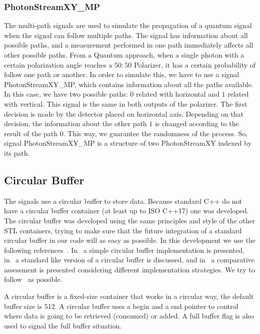 \begin{refsection}
\subsubsection{PhotonStreamXY\_MP}
The multi-path signals are used to simulate the propagation of a quantum signal when the signal can follow multiple paths. The signal has information about all possible paths, and a measurement performed in one path immediately affects all other possible paths.
From a Quantum approach, when a single photon with a certain polarization angle reaches a $50:50$ Polarizer, it has a certain probability of follow one path or another. In order to simulate this, we have to use a signal PhotonStreamXY\_MP, which contains information about all the paths available. In this case, we have two possible paths: $0$ related with horizontal and $1$ related with vertical. This signal is the same in both outputs of the polarizer. The first decision is made by the detector placed on horizontal axis. Depending on that decision, the information about the other path $1$ is changed according to the result of the path $0$. This way, we guarantee the randomness of the process. So, signal PhotonStreamXY\_MP is a structure of two PhotonStreamXY indexed by its path.

\subsection{Circular Buffer}

The signals use a circular buffer to store data.
Because standard C++ do not have a circular buffer container (at least up to ISO C++17) one was developed.
The circular buffer was developed using the same principles and style of the other STL containers, trying to make sure that the future integration of a standard circular buffer in our code will as easy as possible.
In this development we use the following references~\cite{Johnston17, Gaspar18, Guntheroth18}.
In~\cite{Johnston17} a simple circular buffer implementation is presented, in~\cite{Gaspar18} a standard like version of a circular buffer is discussed, and in~\cite{Guntheroth18} a comparative assessment is presented considering different implementation strategies.
We try to follow~\cite{Gaspar18} as possible.

A circular buffer is a fixed-size container that works in a circular way, the default buffer size is 512.
A circular buffer uses a begin and a end pointer to control where data is going to be retrieved (consumed) or added.
A full buffer flag is also used to signal the full buffer situation.


\end{refsection}
